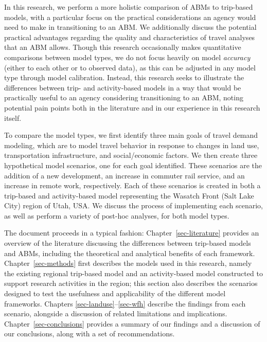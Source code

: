 \documentclass[fancy, twoside, mastersfancy, ms]{byuthesis}
\begin{document}
In this research, we perform a more holistic comparison of ABMs to
trip-based models, with a particular focus on the practical
considerations an agency would need to make in transitioning to an ABM.
We additionally discuss the potential practical advantages regarding the
quality and characteristics of travel analyses that an ABM allows.
Though this research occasionally makes quantitative comparisons between
model types, we do not focus heavily on model \emph{accuracy} (either to
each other or to observed data), as this can be adjusted in any model
type through model calibration. Instead, this research seeks to
illustrate the differences between trip- and activity-based models in a
way that would be practically useful to an agency considering
transitioning to an ABM, noting potential pain points both in the
literature and in our experience in this research itself.

To compare the model types, we first identify three main goals of travel
demand modeling, which are to model travel behavior in response to
changes in land use, transportation infrastructure, and social/economic
factors. We then create three hypothetical model scenarios, one for each
goal identified. These scenarios are the addition of a new development,
an increase in commuter rail service, and an increase in remote work,
respectively. Each of these scenarios is created in both a trip-based
and activity-based model representing the Wasatch Front (Salt Lake City)
region of Utah, USA. We discuss the process of implementing each
scenario, as well as perform a variety of post-hoc analyses, for both
model types.

The document proceeds in a typical fashion: Chapter~\ref{sec-literature}
provides an overview of the literature discussing the differences
between trip-based models and ABMs, including the theoretical and
analytical benefits of each framework. Chapter~\ref{sec-methods} first
describes the models used in this research, namely the existing regional
trip-based model and an activity-based model constructed to support
research activities in the region; this section also describes the
scenarios designed to test the usefulness and applicability of the
different model frameworks. Chapters \ref{sec-landuse}--\ref{sec-wfh}
describe the findings from each scenario, alongside a discussion of
related limitations and implications. Chapter~\ref{sec-conclusions}
provides a summary of our findings and a discussion of our conclusions,
along with a set of recommendations.

\end{document}
